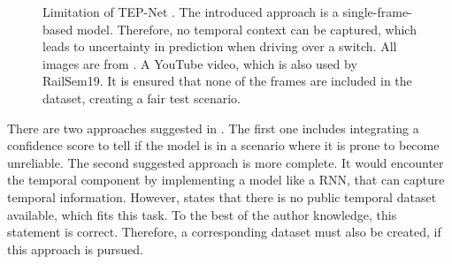 \begin{figure}[H]
    \begin{minipage}{1.0\textwidth}
        \centering
    \end{minipage}

    \vspace{0.5cm}
    \caption{Limitation of \ac{TEP}-Net \cite{tepNet2024}. The introduced approach is a single-frame-based model. Therefore, no temporal context can be captured, which leads to uncertainty in prediction when driving over a switch.
    All images are from \cite{limitaion_youtube_video}. A YouTube video, which is also used by RailSem19. It is ensured that none of the frames are included in the dataset, creating a fair test scenario.}
    \label{fig:limitationSwitch}
\end{figure}

There are two approaches suggested in \cite{tepNet2024}.
The first one includes integrating a confidence score to tell if the model is in a scenario where it is prone to become unreliable.
The second suggested approach is more complete.
It would encounter the temporal component by implementing a model like a \ac{RNN}, that can capture temporal information.
However, \cite{tepNet2024} states that there is no public temporal dataset available, which fits this task.
To the best of the author knowledge, this statement is correct.
Therefore, a corresponding dataset must also be created, if this approach is pursued.